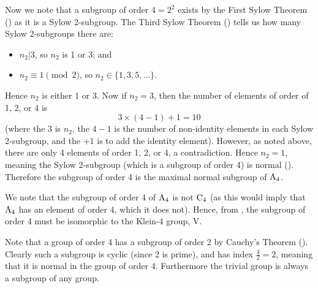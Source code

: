 \begin{questions}
    Now we note that a subgroup of order $4 = 2^2$ exists by the First Sylow Theorem () as it is a Sylow 2-subgroup. The Third Sylow Theorem () tells us how many Sylow 2-subgroups there are:
    \begin{itemize}
        \item $n_2 \vert 3$, so $n_2$ is 1 or 3; and
        \item $n_2 \equiv 1 \pmod2$, so $n_2 \in \{1, 3, 5, \dots\}$.
    \end{itemize}
    Hence $n_2$ is either 1 or 3. Now if $n_2 = 3$, then the number of elements of order of 1, 2, or 4 is
    \[
        3 \times (4 - 1) + 1 = 10
    \]
    (where the 3 is $n_2$, the $4-1$ is the number of non-identity elements in each Sylow 2-subgroup, and the $+1$ is to add the identity element). However, as noted above, there are only 4 elements of order 1, 2, or 4, a contradiction. Hence $n_2 = 1$, meaning the Sylow 2-subgroup (which is a subgroup of order 4) is normal (). Therefore the subgroup of order 4 is the maximal normal subgroup of $\mathrm{A}_{4}$.

    We note that the subgroup of order 4 of $\mathrm{A}_{4}$ is not $\mathrm{C}_{4}$ (as this would imply that $\mathrm{A}_{4}$ has an element of order 4, which it does not). Hence, from , the subgroup of order 4 must be isomorphic to the Klein-4 group, $\mathrm{V}$.

    Note that a group of order 4 has a subgroup of order 2 by Cauchy's Theorem (). Clearly such a subgroup is cyclic (since 2 is prime), and has index $\frac42 = 2$, meaning that it is normal in the group of order 4. Furthermore the trivial group is always a subgroup of any group.


\end{questions}

